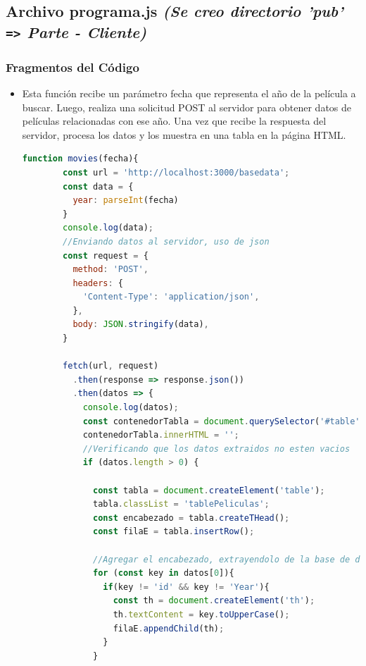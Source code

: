 \documentclass{article}
\begin{document}

  \subsection{Archivo programa.js \textit{(Se creo directorio 'pub' \protect\texttt{=>} Parte - Cliente)}}
  

  \subsubsection{Fragmentos del Código}
  \begin{itemize}
    \item  Esta función recibe un parámetro fecha que representa el año de la película a buscar. 
      Luego, realiza una solicitud POST al servidor para obtener datos de películas relacionadas con ese año. 
      Una vez que recibe la respuesta del servidor, procesa los datos y los muestra en una tabla en la página HTML.
    \begin{lstlisting}[language=JavaScript,caption=function movies()]
      function movies(fecha){
        const url = 'http://localhost:3000/basedata';
        const data = {
          year: parseInt(fecha)
        }
        console.log(data);
        //Enviando datos al servidor, uso de json
        const request = {
          method: 'POST',
          headers: {
            'Content-Type': 'application/json',
          },
          body: JSON.stringify(data),
        }
        
        fetch(url, request)
          .then(response => response.json())
          .then(datos => {
            console.log(datos);
            const contenedorTabla = document.querySelector('#table');
            contenedorTabla.innerHTML = '';
            //Verificando que los datos extraidos no esten vacios
            if (datos.length > 0) {
              
              const tabla = document.createElement('table');
              tabla.classList = 'tablePeliculas';
              const encabezado = tabla.createTHead();
              const filaE = tabla.insertRow();
              
              //Agregar el encabezado, extrayendolo de la base de datos
              for (const key in datos[0]){
                if(key != 'id' && key != 'Year'){
                  const th = document.createElement('th');
                  th.textContent = key.toUpperCase();
                  filaE.appendChild(th);
                }
              }
              

\end{lstlisting}
\end{itemize}
\end{document}
